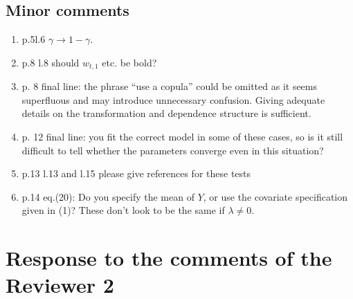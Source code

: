 \documentclass[11pt]{article}
\begin{document}
\subsection*{Minor comments}
\begin{enumerate}[1.]
  \item p.5l.6 $\gamma \rightarrow 1 - \gamma$.

  \item p.8 l.8 should $w_{t,1}$ etc. be bold?

  \item p. 8 final line: the phrase ``use a copula'' could be omitted as it seems superfluous and may introduce unnecessary confusion. Giving adequate details on the transformation and dependence structure is sufficient.

  \item p. 12 final line: you fit the correct model in some of these cases, so is it still difficult to tell whether the parameters converge even in this situation?

  \item p.13 l.13 and l.15 please give references for these tests

  \item p.14 eq.(20): Do you specify the mean of $Y$, or use the covariate specification given in (1)? These don’t look to be the same if $\lambda \neq 0$.
\end{enumerate}

\newpage
\section*{Response to the comments of the Reviewer 2}
\end{document}
